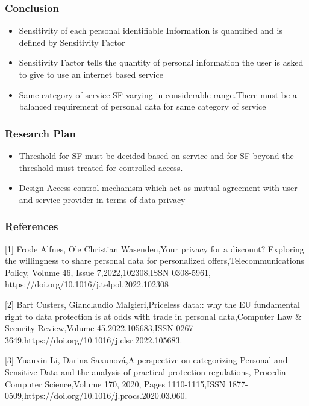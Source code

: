 \documentclass{beamer}
\begin{document}
\begin{frame}
\frametitle{ Conclusion}
\begin{itemize}
\item {Sensitivity of each personal identifiable Information is quantified and is defined by
Sensitivity Factor}
\item {Sensitivity Factor tells the quantity of personal information the user is asked to give to use an internet based service} 
\item {Same category of service SF varying in considerable range.There must be a balanced requirement of personal data for same category of service} 

\end{itemize}
\end{frame}

\begin{frame}
\frametitle{ Research Plan}
\begin{itemize}
\item {Threshold for SF must be decided based on service and for SF beyond the threshold must treated for controlled access.}
\item {Design 
Access control mechanism which act as mutual agreement with user and service provider in terms of data privacy  }
\end{itemize}

\end{frame}


\begin{frame}
\frametitle{References}

[1] Frode Alfnes, Ole Christian Wasenden,Your privacy for a discount? Exploring the willingness to share personal data for personalized offers,Telecommunications Policy,
Volume 46, Issue 7,2022,102308,ISSN 0308-5961, https://doi.org/10.1016/j.telpol.2022.102308
 


[2]	Bart Custers, Gianclaudio Malgieri,Priceless data:: why the EU fundamental right to data protection is at odds with trade in personal data,Computer Law & Security Review,Volume 45,2022,105683,ISSN 0267-3649,https://doi.org/10.1016/j.clsr.2022.105683.




[3]	Yuanxin Li, Darina Saxunová,A perspective on categorizing Personal and Sensitive Data and the analysis of practical protection regulations, Procedia Computer Science,Volume 170,
2020, Pages 1110-1115,ISSN 1877-0509,https://doi.org/10.1016/j.procs.2020.03.060.

\end{frame}
\end{document}
